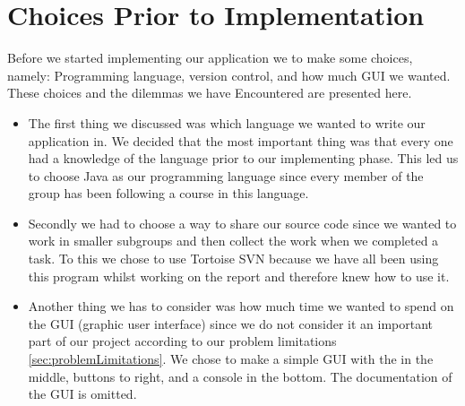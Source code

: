 \chapter{Choices Prior to Implementation}
Before we started implementing our application we to make some choices, namely: Programming language, version control, and how much GUI we wanted.
These choices and the dilemmas we have Encountered are presented here.

\begin{itemize}
	\item The first thing we discussed was which language we wanted to write our application in.
We decided that the most important thing was that every one had a knowledge of the language prior to our implementing phase.
This led us to choose Java as our programming language since every member of the group has been following a course in this language.

	\item Secondly we had to choose a way to share our source code since we wanted to work in smaller subgroups and then collect the work when we completed a task.
To this we chose to use Tortoise SVN because we have all been using this program whilst working on the report and therefore knew how to use it.

	\item Another thing we has to consider was how much time we wanted to spend on the GUI (graphic user interface) since we do not consider it an important part of our project according to our problem limitations \ref{sec:problemLimitations}.
We chose to make a simple GUI with the \rubik{} in the middle, buttons to right, and a console in the bottom.
The documentation of the GUI is omitted.
\end{itemize}

